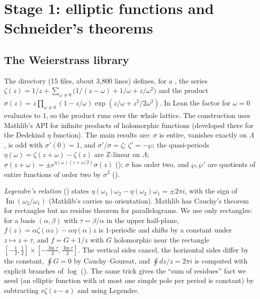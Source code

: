 \documentclass[11pt]{amsart}
\theoremstyle{definition}
\theoremstyle{remark}
\numberwithin{equation}{section}
\newcommand{\ZZ}{\mathbb{Z}}
\begin{document}
\section{Stage 1: elliptic functions and Schneider's theorems}\label{sec:stage1}

\subsection{The Weierstrass library}
The directory  (15 files, about 3{,}800 lines) defines, for a
, the series
$\zeta(z)=1/z+\sum_{\omega\ne0}\bigl(1/(z-\omega)+1/\omega+z/\omega^2\bigr)$ and the product
$\sigma(z)=z\prod_{\omega\ne0}(1-z/\omega)\exp(z/\omega+z^2/2\omega^2)$. In Lean the factor for $\omega=0$
evaluates to $1$, so the product runs over the whole lattice. The construction uses Mathlib's API for
infinite products of holomorphic functions (developed there for the Dedekind $\eta$ function). The main results are: $\sigma$ is entire, vanishes exactly on
$\Lambda$, is odd with $\sigma'(0)=1$, and $\sigma'/\sigma=\zeta$; $\zeta'=-\wp$; the quasi-periods
$\eta(\omega)=\zeta(z+\omega)-\zeta(z)$ are $\ZZ$-linear on $\Lambda$; $\sigma(z+\omega)=\pm
e^{\eta(\omega)(z+\omega/2)}\sigma(z)$ (); $\sigma$ has order two, and $\wp,\wp'$ are
quotients of entire functions of order two by $\sigma^3$ ().

\emph{Legendre's relation} () states
$\eta(\omega_1)\omega_2-\eta(\omega_2)\omega_1=\pm2\pi i$, with the sign of $\operatorname{Im}(\omega_2/\omega_1)$
(Mathlib's  carries no orientation). Mathlib has Cauchy's theorem for rectangles but
no residue theorem for parallelograms. We use only rectangles: for a basis $(\alpha,\beta)$ with
$\tau=\beta/\alpha$ in the upper half-plane, $f(z)=\alpha\zeta(\alpha z)-\alpha\eta(\alpha)z$ is $1$-periodic and
shifts by a constant under $z\mapsto z+\tau$, and $f=G+1/z$ with $G$ holomorphic near the rectangle
$[-\frac12,\frac12]\times[-\frac{\operatorname{Im}\tau}2,\frac{\operatorname{Im}\tau}2]$. The vertical sides
cancel, the horizontal sides differ by the constant, $\oint G=0$ by Cauchy--Goursat, and $\oint
dz/z=2\pi i$ is computed with explicit branches of $\log$ (). The same trick
gives the ``sum of residues'' fact we need (an elliptic function with at most one simple pole per
period is constant) by subtracting $r\zeta(z-a)$ and using Legendre.
\end{document}
